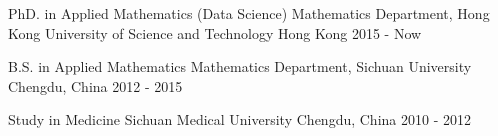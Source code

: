 \begin{cventries}
     \cventry
    {PhD. in Applied Mathematics (Data Science)}
    {Mathematics Department, Hong Kong University of Science and Technology}
    {Hong Kong}
    {2015 - Now}
    { }


     \cventry
    {B.S. in Applied Mathematics}
    {Mathematics Department, Sichuan University}
    {Chengdu, China}
    {2012 - 2015}
    { }



  \cventry
    {Study in Medicine}
    {Sichuan Medical University}
    {Chengdu, China}
    {2010 - 2012}
    {
    }

    
    
    
    
    
    
\end{cventries}
